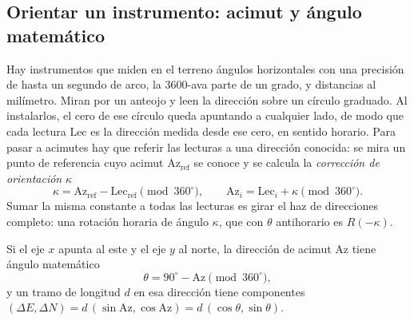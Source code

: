 \begin{ejemplo}[Rotar \(p=(3,1)\) un ángulo de \(30^\circ\) alrededor de \(c=(1,1)\)]
\begin{center}
\end{center}
\end{ejemplo}

\subsection{Orientar un instrumento: acimut y ángulo matemático}\label{sec:acimut-campo}

Hay instrumentos que miden en el terreno ángulos horizontales con una precisión de hasta un
segundo de arco, la 3600-ava parte de un grado, y distancias al milímetro. Miran por un
anteojo y leen la dirección sobre un círculo graduado. Al instalarlos, el cero de ese círculo
queda apuntando a cualquier lado, de modo que cada lectura
\(\mathrm{Lec}\) es la dirección medida desde ese cero, en sentido horario. Para pasar a
acimutes hay que referir las lecturas a una dirección conocida: se mira un punto de
referencia cuyo acimut \(\mathrm{Az}_{\text{ref}}\) se conoce y se calcula la \emph{corrección de
orientación} \(\kappa\)
\[
\kappa=\mathrm{Az}_{\text{ref}}-\mathrm{Lec}_{\text{ref}}\pmod{360^\circ},
\qquad
\mathrm{Az}_i=\mathrm{Lec}_i+\kappa\pmod{360^\circ}.
\]
Sumar la misma constante a todas las lecturas es girar el haz de direcciones completo: una
rotación horaria de ángulo \(\kappa\), que con \(\theta\) antihorario es \(R(-\kappa)\).

\begin{proposicion}\label{prop:acimut-theta}
Si el eje \(x\) apunta al este y el eje \(y\) al norte, la dirección de acimut \(\mathrm{Az}\)
tiene ángulo matemático
\[
\theta=90^\circ-\mathrm{Az}\pmod{360^\circ},
\]
y un tramo de longitud \(d\) en esa dirección tiene componentes
\((\Delta E,\Delta N)=d\,(\sin\mathrm{Az},\cos\mathrm{Az})=d\,(\cos\theta,\sin\theta)\).
\end{proposicion}

